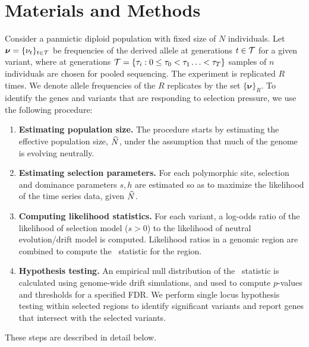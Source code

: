 \documentclass[9pt,twocolumn,twoside]{gsajnl}
\begin{document}
\section{Materials and Methods}
\label{sec:method}
Consider a panmictic diploid population with fixed size of $N$
individuals.  Let $\bm{ \nu} =\{\nu_t\}_{t\in{\cal T}}$ be frequencies of
the derived allele at generations $t\in{\cal T}$ for a given variant, where
at generations ${\cal T}= \{\tau_i: 0\le \tau_0<\tau_1\ldots< \tau_T\}$
samples of $n$ individuals are chosen for pooled sequencing. The
experiment is replicated $R$ times. We denote allele frequencies of
the $R$ replicates by the set $\{\bm{\nu}\}_R$.  To identify the genes
and variants that are responding to selection pressure, we use the
following procedure:
\begin{enumerate}
	\item {\bf Estimating population size.} The procedure starts by
	estimating the effective population size, $\widehat{N}$, under the
	assumption that much of the genome is evolving neutrally.
	\item {\bf Estimating selection parameters.} For each polymorphic
	site, selection and dominance parameters $s,h$ are estimated so
	as to maximize the likelihood of the time series data, given $\widehat{N}$.
	\item {\bf Computing likelihood statistics.} For each variant, a
	log-odds ratio of the likelihood of selection model ($s>0$) to the
	likelihood of neutral evolution/drift model is computed. Likelihood
	ratios in a genomic region are combined to compute the \comale\
	statistic for the region.
	\item {\bf Hypothesis testing.} An empirical null distribution of the
	\comale\ statistic is calculated using genome-wide drift
	simulations, and used to compute $p$-values and thresholds for a
	specified FDR. We perform single locus hypothesis testing within
	selected regions to identify significant variants and report genes
	that intersect with the selected variants.
\end{enumerate}
These steps are described in detail below.
\end{document}
